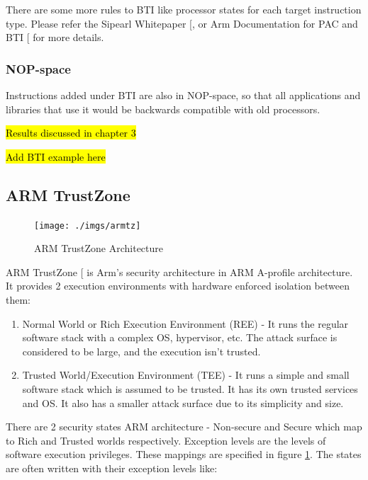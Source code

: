 \documentclass[a4paper, nobind]{templates/ociamthesis}
\providecommand{\tightlist}{%
  \setlength{\itemsep}{0pt}\setlength{\parskip}{0pt}}
\begin{document}
There are some more rules to BTI like processor states for each target instruction type.
Please refer the Sipearl Whitepaper {[}\citeproc{ref-sipearl}{52}{]}, or Arm Documentation for PAC and BTI {[}\citeproc{ref-arm-pacbti}{9}{]} for more details.

\subsubsection{NOP-space}\label{nop-space}

Instructions added under BTI are also in NOP-space, so that all applications and
libraries that use it would be backwards compatible with old processors.

\hl{Results discussed in chapter 3}

\hl{Add BTI example here}

\subsection{ARM TrustZone}\label{arm-trustzone}

\begin{figure}[H]

{\centering \texttt{[image: ./imgs/armtz]} 

}

\caption{ARM TrustZone Architecture}\label{fig:armtz-arch}
\end{figure}

ARM TrustZone {[}\citeproc{ref-armtz}{7}{]} is Arm's security architecture in ARM A-profile architecture.
It provides 2 execution environments with hardware enforced isolation between them:

\begin{enumerate}
\def\labelenumi{\arabic{enumi}.}
\tightlist
\item
  Normal World or Rich Execution Environment (REE) - It runs the regular software
  stack with a complex OS, hypervisor, etc. The attack surface is considered to be large,
  and the execution isn't trusted.
\item
  Trusted World/Execution Environment (TEE) - It runs a simple and small software
  stack which is assumed to be trusted. It has its own trusted services and OS.
  It also has a smaller attack surface due to its simplicity and size.
\end{enumerate}

There are 2 security states ARM architecture - Non-secure and Secure which map
to Rich and Trusted worlds respectively.
Exception levels are the levels of software execution privileges.
These mappings are specified in figure \ref{fig:armtz-arch}.
The states are often written with their exception levels like:
\end{document}
